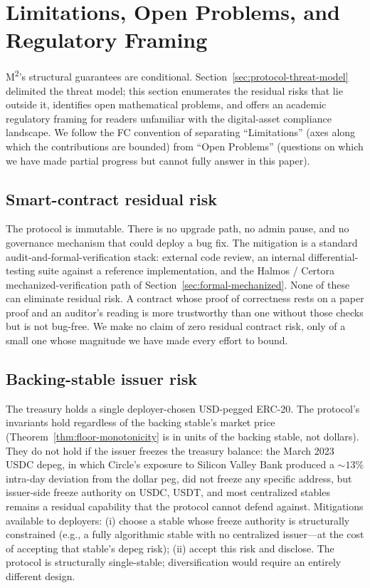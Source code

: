 \section{Limitations, Open Problems, and Regulatory Framing}
\label{sec:limitations}

M\textsuperscript{2}'s structural guarantees are conditional. Section~\ref{sec:protocol-threat-model} delimited the threat model; this section enumerates the residual risks that lie outside it, identifies open mathematical problems, and offers an academic regulatory framing for readers unfamiliar with the digital-asset compliance landscape. We follow the FC convention of separating ``Limitations'' (axes along which the contributions are bounded) from ``Open Problems'' (questions on which we have made partial progress but cannot fully answer in this paper).

\subsection{Smart-contract residual risk}
\label{sec:lim-contract}

The protocol is immutable. There is no upgrade path, no admin pause, and no governance mechanism that could deploy a bug fix. The mitigation is a standard audit-and-formal-verification stack: external code review, an internal differential-testing suite against a reference implementation, and the Halmos / Certora mechanized-verification path of Section~\ref{sec:formal-mechanized}. None of these can eliminate residual risk. A contract whose proof of correctness rests on a paper proof and an auditor's reading is more trustworthy than one without those checks but is not bug-free. We make no claim of zero residual contract risk, only of a small one whose magnitude we have made every effort to bound.

\subsection{Backing-stable issuer risk}
\label{sec:lim-stable}

The treasury holds a single deployer-chosen USD-pegged ERC-20. The protocol's invariants hold regardless of the backing stable's market price (Theorem~\ref{thm:floor-monotonicity} is in units of the backing stable, not dollars). They do not hold if the issuer freezes the treasury balance: the March 2023 USDC depeg, in which Circle's exposure to Silicon Valley Bank produced a $\sim 13\%$ intra-day deviation from the dollar peg, did not freeze any specific address, but issuer-side freeze authority on USDC, USDT, and most centralized stables remains a residual capability that the protocol cannot defend against. Mitigations available to deployers: (i) choose a stable whose freeze authority is structurally constrained (e.g., a fully algorithmic stable with no centralized issuer---at the cost of accepting that stable's depeg risk); (ii) accept this risk and disclose. The protocol is structurally single-stable; diversification would require an entirely different design.


